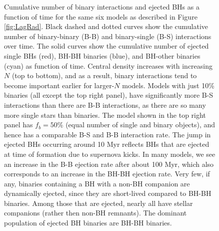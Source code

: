 \documentclass[12pt,preprint]{aastex}
\begin{document}
\begin{figure}[!h]
	\caption{Cumulative number of binary interactions and ejected BHs as a function of time for the 
	same six models as described in Figure \ref{fig:LagRad}. Black dashed and dotted curves show 
	the cumulative number of binary-binary (B-B) and binary-single (B-S) interactions over time. 
	The solid curves show the cumulative number of ejected single BHs (red),
	BH-BH binaries (blue), and BH-other binaries (cyan) as  function of time. Central density increases
	with increasing $N$ (top to bottom), and as a result, binary interactions tend to become important 
	earlier for larger-$N$ models. Models with just 10\% binaries (all except the top right panel),
	have significantly more B-S interactions than there are B-B interactions, as there are so many 
	more single stars than binaries. The model shown in the top right panel has $f_b=50$\% 
	(equal number of single and binary objects), and hence has a comparable B-S and B-B interaction rate.
	The jump in ejected BHs occurring around 10 Myr reflects BHs that are ejected at time of
	formation due to supernova kicks. In many models, we see an increase in the B-B ejection rate
	after about 100 Myr, which also corresponds to an increase in the BH-BH ejection rate.
	Very few, if any, binaries containing a BH with a non-BH companion are dynamically ejected, 
	since they are short-lived compared to BH-BH binaries. Among those that are ejected, 
	nearly all have stellar companions (rather then non-BH remnants). The dominant population
	of ejected BH binaries are BH-BH binaries. 
	}
	
	\label{fig:CumBinintEscBHs}
\end{figure}

\end{document}
